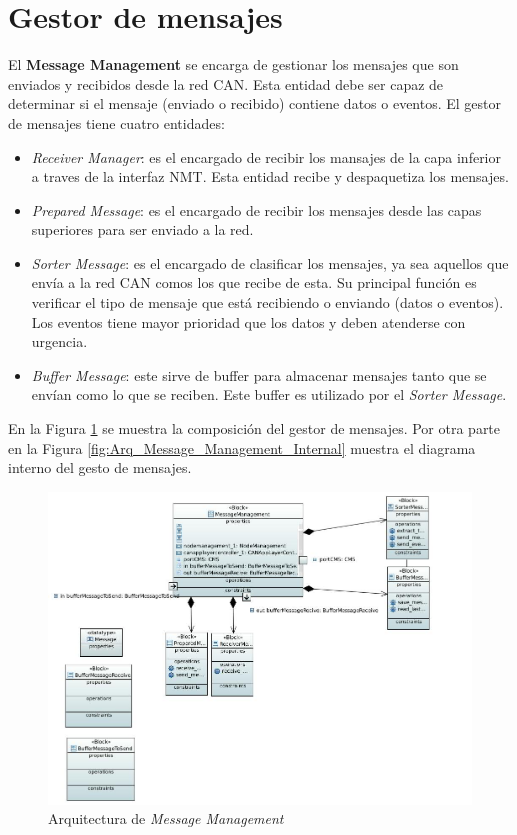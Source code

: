 \section{Gestor de mensajes}
El \textbf{Message Management} se encarga de gestionar los mensajes que son
enviados y recibidos desde la red CAN. Esta entidad debe ser capaz de determinar
si el mensaje (enviado o recibido) contiene datos o eventos. El gestor de
mensajes tiene cuatro entidades:
\begin{itemize}
\item \textit{Receiver Manager}: es el encargado de recibir los mansajes de la
  capa inferior a traves de la interfaz NMT. Esta entidad recibe y despaquetiza
  los mensajes.
\item \textit{Prepared Message}: es el encargado de recibir los mensajes desde
  las capas superiores para ser enviado a la red.
\item \textit{Sorter Message}: es el encargado de clasificar los mensajes,
  ya sea aquellos que envía a la red CAN comos los que recibe de esta. Su
  principal función es verificar  el tipo de mensaje que está recibiendo o
  enviando (datos o eventos). Los eventos tiene mayor prioridad que los datos
  y deben atenderse con urgencia.
\item \textit{Buffer Message}: este sirve de buffer para almacenar mensajes
  tanto que se envían como lo que se reciben. Este buffer es utilizado por el
  \textit{Sorter Message}.
\end{itemize}

En la Figura \ref{fig:Arq_Message_Management} se muestra la composición del
gestor de mensajes. Por otra parte en la Figura
\ref{fig:Arq_Message_Management_Internal} muestra el diagrama interno del
gesto de mensajes.

\begin{figure}[h!]
 \centering
 \includegraphics[scale=0.4]{images/Secciones/AppendixA/MessageManagement.JPG}
  \caption{Arquitectura de \textit{Message Management}}
\label{fig:Arq_Message_Management}
\end{figure}

